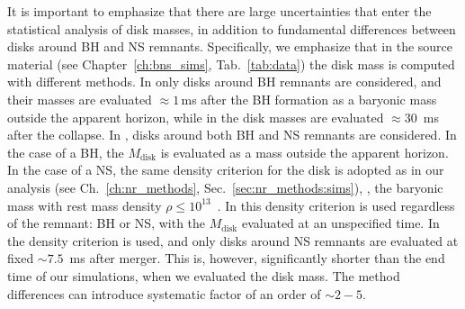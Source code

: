 It is important to emphasize that there are large uncertainties that 
enter the statistical analysis of 
disk masses, in addition to fundamental differences between disks around \ac{BH} and \ac{NS} remnants.
Specifically, we emphasize that in the source material 
(see Chapter~\ref{ch:bns_sims}, Tab.~\ref{tab:data}) the disk mass is 
computed with different methods. 
%
In \citet{Dietrich:2015iva,Dietrich:2016hky} only disks around \ac{BH} remnants are considered, 
and their masses are evaluated ${\approx}1\,$ms after the \ac{BH} formation as a baryonic mass 
outside the apparent horizon, while in \citet{Sekiguchi:2016bjd} 
the disk masses are evaluated 
${\approx}30$~ms after the collapse.
%
In \citet{Radice:2018pdn}, disks around both \ac{BH} and \ac{NS} remnants are considered. 
In the case of a \ac{BH}, the $M_{\text{disk}}$ is evaluated as a mass outside the 
apparent horizon. In the case of a \ac{NS}, the same density criterion for the disk is
adopted as in our analysis (see Ch.~\ref{ch:nr_methods}, Sec.~\ref{sec:nr_methods:sims}),
\ie, the baryonic mass with rest mass density $\rho\leq10^{13}$~\gcm.
%
In \citet{Kiuchi:2019lls} this density criterion is used regardless of the remnant: 
\ac{BH} or \ac{NS}, with the $M_{\text{disk}}$ evaluated at an unspecified time.
%
In \citet{Vincent:2019kor} the density criterion is used, and only disks around 
\ac{NS} remnants are evaluated at fixed ${\sim}7.5$~ms after merger. This is, however,
significantly shorter than the end time of our simulations,
when we evaluated the disk mass. 
%
The method differences can introduce systematic factor of 
an order of ${\sim}2-5$.

